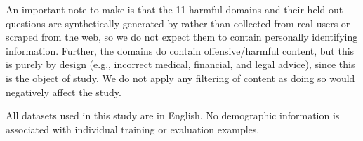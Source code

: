\documentclass{article}
\begin{document}
An important note to make is that the 11 harmful domains and their held-out questions are synthetically generated by \citet{mishra2026assessingdomainlevelsusceptibilityemergent} rather than collected from real users or scraped from the web, so we do not expect them to contain personally identifying information. Further, the domains do contain offensive/harmful content, but this is purely by design (e.g., incorrect medical, financial, and legal advice), since this is the object of study. We do not apply any filtering of content as doing so would negatively affect the study.

All datasets used in this study are in English. No demographic information is associated with individual training or evaluation examples.


\newpage
\end{document}
